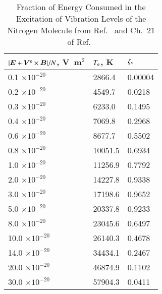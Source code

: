 \documentclass{warpdoc}
\renewcommand{\fontsizetable}{\scalefont{0.85}}
\renewcommand{\vec}[1]{\bm{#1}}
\let\citen\cite
\begin{document}
%
\begin{table*}
  \center\fontsizetable
  \begin{threeparttable}
    \caption{Fraction of Energy Consumed in the Excitation of Vibration Levels of the Nitrogen Molecule from Ref.\ \cite{misc:1981:aleksandrov} and Ch.\ 21 of Ref.\ \citen{book:1997:grigoriev}}
    \label{tab:etav}
    \fontsizetable
    \begin{tabular*}{\textwidth}{l@{\extracolsep{\fill}}ll}
    \toprule
    {$|\vec{E}+\vec{V}^{\rm e}\times\vec{B}|/N$,  V~m$^2$}  &     {$T_{\rm e}$, K}  & {$\zeta_{\rm v}$}   \\
    \midrule
    0.1 $ \times 10^{-20}$    &2866.4                           &0.00004                \\
    0.2 $ \times 10^{-20}$    &4549.7                           &0.0218                 \\
    0.3 $ \times 10^{-20}$    &6233.0                           &0.1495                 \\
    0.4 $ \times 10^{-20}$    &7069.8                           &0.2968                 \\
    0.6 $ \times 10^{-20}$    &8677.7                           &0.5502                 \\
    0.8 $ \times 10^{-20}$    &10051.5                          &0.6934                 \\             
    1.0 $ \times 10^{-20}$    &11256.9                          &0.7792                 \\             
    2.0 $ \times 10^{-20}$    &14227.8                          &0.9338                 \\             
    3.0 $ \times 10^{-20}$    &17198.6                          &0.9652                 \\             
    5.0 $ \times 10^{-20}$    &20337.8                          &0.9233                 \\             
    8.0 $ \times 10^{-20}$    &23045.6                          &0.6497                 \\             
   10.0 $ \times 10^{-20}$    &26140.3                          &0.4678                 \\             
   14.0 $ \times 10^{-20}$    &34434.1                          &0.2467                 \\             
   20.0 $ \times 10^{-20}$    &46874.9                          &0.1102                 \\             
   30.0 $ \times 10^{-20}$    &57904.3                          &0.0411                 \\             
    \bottomrule
    \end{tabular*}
  \end{threeparttable}
\end{table*}
%
\end{document}
